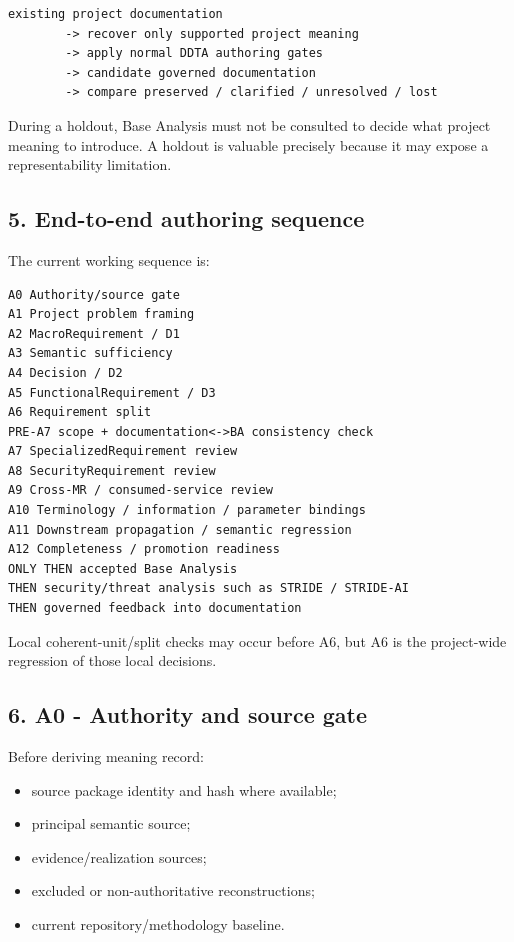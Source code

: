 \documentclass[11pt,a4paper]{article}
\providecommand{\tightlist}{\setlength{\itemsep}{0pt}\setlength{\parskip}{0pt}}
\begin{document}
\begin{verbatim}
existing project documentation
        -> recover only supported project meaning
        -> apply normal DDTA authoring gates
        -> candidate governed documentation
        -> compare preserved / clarified / unresolved / lost
\end{verbatim}

During a holdout, Base Analysis must not be consulted to decide what
project meaning to introduce. A holdout is valuable precisely because it
may expose a representability limitation.

\subsection{5. End-to-end authoring
sequence}\label{5-end-to-end-authoring-sequence}

The current working sequence is:

\begin{verbatim}
A0 Authority/source gate
A1 Project problem framing
A2 MacroRequirement / D1
A3 Semantic sufficiency
A4 Decision / D2
A5 FunctionalRequirement / D3
A6 Requirement split
PRE-A7 scope + documentation<->BA consistency check
A7 SpecializedRequirement review
A8 SecurityRequirement review
A9 Cross-MR / consumed-service review
A10 Terminology / information / parameter bindings
A11 Downstream propagation / semantic regression
A12 Completeness / promotion readiness
ONLY THEN accepted Base Analysis
THEN security/threat analysis such as STRIDE / STRIDE-AI
THEN governed feedback into documentation
\end{verbatim}

Local coherent-unit/split checks may occur before A6, but A6 is the
project-wide regression of those local decisions.

\subsection{6. A0 - Authority and source
gate}\label{6-a0---authority-and-source-gate}

Before deriving meaning record:

\begin{itemize}
\tightlist
\item
  source package identity and hash where available;
\item
  principal semantic source;
\item
  evidence/realization sources;
\item
  excluded or non-authoritative reconstructions;
\item
  current repository/methodology baseline.
\end{itemize}
\end{document}
